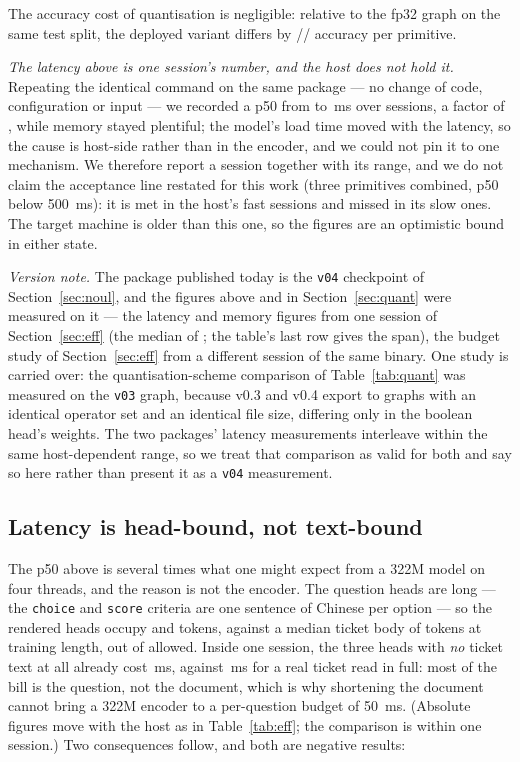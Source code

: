 \documentclass[11pt,a4paper]{article}
\begin{document}
The accuracy cost of quantisation is negligible: relative to the fp32 graph on the same test split, the deployed variant differs by \QuantDeltaChoice/\QuantDeltaScore/\QuantDeltaNoul{} accuracy per primitive.

\emph{The latency above is one session's number, and the host does not hold it.} Repeating the identical command on the same package --- no change of code, configuration or input --- we recorded a p50 from \LatPFiveZeroBest{} to \LatPFiveZeroWorst\,ms over \LatSessions{} sessions, a factor of \LatSpread, while memory stayed plentiful; the model's load time moved with the latency, so the cause is host-side rather than in the encoder, and we could not pin it to one mechanism. We therefore report a session together with its range, and we do not claim the acceptance line restated for this work (three primitives combined, p50 below \SI{500}{\milli\second}): it is met in the host's fast sessions and missed in its slow ones. The target machine is older than this one, so the figures are an optimistic bound in either state.

\emph{Version note.} The package published today is the \texttt{v04} checkpoint of Section~\ref{sec:noul}, and the figures above and in Section~\ref{sec:quant} were measured on it --- the latency and memory figures from one session of Section~\ref{sec:eff} (the median of \LatSessions{}; the table's last row gives the span), the budget study of Section~\ref{sec:eff} from a different session of the same binary. One study is carried over: the quantisation-scheme comparison of Table~\ref{tab:quant} was measured on the \texttt{v03} graph, because v0.3 and v0.4 export to graphs with an identical operator set and an identical file size, differing only in the boolean head's weights. The two packages' latency measurements interleave within the same host-dependent range, so we treat that comparison as valid for both and say so here rather than present it as a \texttt{v04} measurement.

\subsection{Latency is head-bound, not text-bound}

The p50 above is several times what one might expect from a 322M model on four threads, and the reason is not the encoder. The question heads are long --- the \texttt{choice} and \texttt{score} criteria are one sentence of Chinese per option --- so the rendered heads occupy \HeadLenChoice{} and \HeadLenScore{} tokens, against a median ticket body of \TokPFiveZero{} tokens at training length, out of \BenchMaxLen{} allowed. Inside one session, the three heads with \emph{no} ticket text at all already cost \StateOnlyMs\,ms, against \StateFullMs\,ms for a real ticket read in full: most of the bill is the question, not the document, which is why shortening the document cannot bring a 322M encoder to a per-question budget of \num{50}~ms. (Absolute figures move with the host as in Table~\ref{tab:eff}; the comparison is within one session.) Two consequences follow, and both are negative results:
\end{document}
